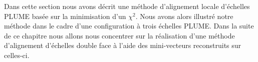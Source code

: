   \medskip
  
  Dans cette section nous avons d\'ecrit une m\'ethode d'alignement locale d'\'echelles PLUME bas\'ee sur la minimisation d'un $\chi^2$. Nous avons alors illustr\'e notre m\'ethode dans le cadre d'une configuration \`a trois \'echelles PLUME. Dans la suite de ce chapitre nous allons nous concentrer sur la r\'ealisation d'une m\'ethode d'alignement d'\'echelles double face \`a l'aide des mini-vecteurs reconstruits sur celles-ci.
  
%     
   
   
   
   
   
% 
%   

